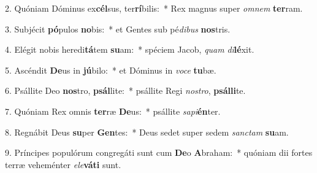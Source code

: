 2. Quóniam Dóminus ex\textbf{cél}sus, ter\textbf{rí}bilis:~*  Rex magnus super \textit{om}\textit{nem} \textbf{ter}ram.\

3. Subjécit \textbf{pó}pulos \textbf{no}bis:~*  et Gentes sub pé\textit{di}\textit{bus} \textbf{nos}tris.\

4. Elégit nobis heredi\textbf{tá}tem \textbf{su}am:~*  spéciem Jacob, \textit{quam} \textit{di}\textbf{lé}xit.\

5. Ascéndit \textbf{De}us in \textbf{jú}bilo:~*  et Dóminus in \textit{vo}\textit{ce} \textbf{tu}bæ.\

6. Psállite Deo \textbf{nos}tro, \textbf{psál}lite:~*  psállite Regi \textit{nos}\textit{tro}, \textbf{psál}\textbf{li}te.\

7. Quóniam Rex omnis \textbf{ter}ræ \textbf{De}us:~*  psállite \textit{sa}\textit{pi}\textbf{én}ter.\

8. Regnábit Deus \textbf{su}per \textbf{Gen}tes:~*  Deus sedet super sedem \textit{sanc}\textit{tam} \textbf{su}am.\

9. Príncipes populórum congregáti sunt cum \textbf{De}o \textbf{A}braham:~*  quóniam dii fortes terræ veheménter \textit{e}\textit{le}\textbf{vá}\textbf{ti} sunt.\

